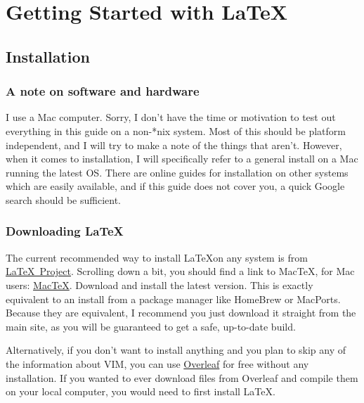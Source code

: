 \documentclass[a4paper, 12pt, twoside]{book}
\begin{document}
\chapter{Getting Started with \LaTeX}
\section{Installation}
\subsection{A note on software and hardware}
I use a Mac computer. Sorry, I don't have the time or motivation to test out everything in this guide on a non-*nix system. Most of this should be platform independent, and I will try to make a note of the things that aren't. However, when it comes to installation, I will specifically refer to a general install on a Mac running the latest OS. There are online guides for installation on other systems which are easily available, and if this guide does not cover you, a quick Google search should be sufficient.
\subsection{Downloading \LaTeX}
The current recommended way to install \LaTeX on any system is from \href{https://www.latex-project.org/get/}{\LaTeX\ Project}. Scrolling down a bit, you should find a link to MacTeX, for Mac users: \href{http://www.tug.org/mactex/}{MacTeX}. Download and install the latest version. This is exactly equivalent to an install from a package manager like HomeBrew or MacPorts. Because they are equivalent, I recommend you just download it straight from the main site, as you will be guaranteed to get a safe, up-to-date build.

Alternatively, if you don't want to install anything and you plan to skip any of the information about VIM, you can use \href{https://www.overleaf.com}{Overleaf} for free without any installation. If you wanted to ever download files from Overleaf and compile them on your local computer, you would need to first install \LaTeX.
\end{document}
